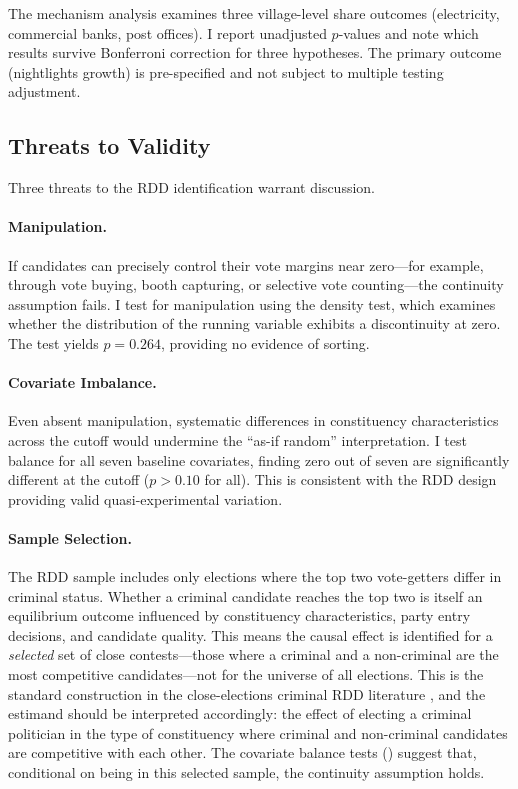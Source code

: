 \documentclass[12pt]{article}
\begin{document}
The mechanism analysis examines three village-level share outcomes (electricity, commercial banks, post offices). I report unadjusted $p$-values and note which results survive Bonferroni correction for three hypotheses. The primary outcome (nightlights growth) is pre-specified and not subject to multiple testing adjustment.

\subsection{Threats to Validity}

Three threats to the RDD identification warrant discussion.

\paragraph{Manipulation.} If candidates can precisely control their vote margins near zero---for example, through vote buying, booth capturing, or selective vote counting---the continuity assumption fails. I test for manipulation using the \citet{mccrary2008} density test, which examines whether the distribution of the running variable exhibits a discontinuity at zero. The test yields $p = 0.264$, providing no evidence of sorting.

\paragraph{Covariate Imbalance.} Even absent manipulation, systematic differences in constituency characteristics across the cutoff would undermine the ``as-if random'' interpretation. I test balance for all seven baseline covariates, finding zero out of seven are significantly different at the cutoff ($p > 0.10$ for all). This is consistent with the RDD design providing valid quasi-experimental variation.

\paragraph{Sample Selection.} The RDD sample includes only elections where the top two vote-getters differ in criminal status. Whether a criminal candidate reaches the top two is itself an equilibrium outcome influenced by constituency characteristics, party entry decisions, and candidate quality. This means the causal effect is identified for a \textit{selected} set of close contests---those where a criminal and a non-criminal are the most competitive candidates---not for the universe of all elections. This is the standard construction in the close-elections criminal RDD literature \citep{prakash2019}, and the estimand should be interpreted accordingly: the effect of electing a criminal politician in the type of constituency where criminal and non-criminal candidates are competitive with each other. The covariate balance tests () suggest that, conditional on being in this selected sample, the continuity assumption holds.
\end{document}
